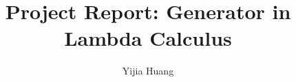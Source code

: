 \documentclass{llncs}
\begin{document}
\title{Project Report: Generator in Lambda Calculus}
\author{Yijia Huang }
\maketitle

\begin{abstract}

\end{abstract}


%

 

 

%




  
\end{document}
